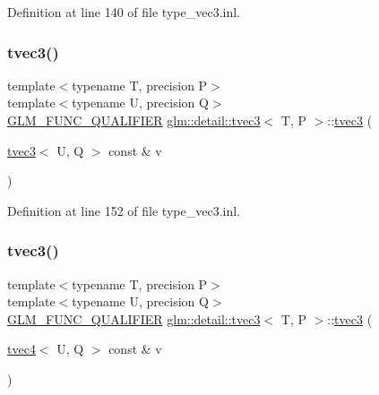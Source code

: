 Definition at line 140 of file type\+\_\+vec3.\+inl.

\mbox{\label{structglm_1_1detail_1_1tvec3_a2b833d493b5fb0bece9b26743b98fa12}} 
\subsubsection{\texorpdfstring{tvec3()}{tvec3()}\hspace{0.1cm}{\footnotesize\ttfamily [16/17]}}
{\footnotesize\ttfamily template$<$typename T, precision P$>$ \\
template$<$typename U, precision Q$>$ \\
\hyperlink{setup_8hpp_a33fdea6f91c5f834105f7415e2a64407}{G\+L\+M\+\_\+\+F\+U\+N\+C\+\_\+\+Q\+U\+A\+L\+I\+F\+I\+ER} \hyperlink{structglm_1_1detail_1_1tvec3}{glm\+::detail\+::tvec3}$<$ T, P $>$\+::\hyperlink{structglm_1_1detail_1_1tvec3}{tvec3} (\begin{DoxyParamCaption}\item[{\hyperlink{structglm_1_1detail_1_1tvec3}{tvec3}$<$ U, Q $>$ const \&}]{v }\end{DoxyParamCaption})}



Definition at line 152 of file type\+\_\+vec3.\+inl.

\mbox{\label{structglm_1_1detail_1_1tvec3_a85838b64a93bfabb899746fc7d3a3bb1}} 
\subsubsection{\texorpdfstring{tvec3()}{tvec3()}\hspace{0.1cm}{\footnotesize\ttfamily [17/17]}}
{\footnotesize\ttfamily template$<$typename T, precision P$>$ \\
template$<$typename U, precision Q$>$ \\
\hyperlink{setup_8hpp_a33fdea6f91c5f834105f7415e2a64407}{G\+L\+M\+\_\+\+F\+U\+N\+C\+\_\+\+Q\+U\+A\+L\+I\+F\+I\+ER} \hyperlink{structglm_1_1detail_1_1tvec3}{glm\+::detail\+::tvec3}$<$ T, P $>$\+::\hyperlink{structglm_1_1detail_1_1tvec3}{tvec3} (\begin{DoxyParamCaption}\item[{\hyperlink{structglm_1_1detail_1_1tvec4}{tvec4}$<$ U, Q $>$ const \&}]{v }\end{DoxyParamCaption})}



